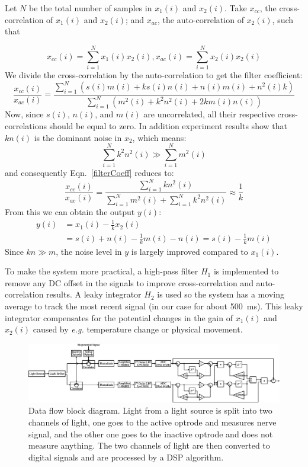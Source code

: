 Let $N$ be the total number of samples in $x_1(i)$ and $x_2(i)$.  Take $x_{cc}$, the cross-correlation of $x_1(i)$ and $x_2(i)$; and $x_{ac}$, the auto-correlation of $x_2(i)$, such that

$$x_{cc}(i)=\displaystyle\sum_{i=1}^{N} x_1(i)x_2(i), x_{ac}(i)=\displaystyle\sum_{i=1}^{N} x_2(i)x_2(i)$$
We divide the cross-correlation by the auto-correlation to get the filter coefficient:
\begin{equation}
\label{filterCoeff}
    \frac{x_{cc}(i)}{x_{ac}(i)} =\frac{\displaystyle\sum_{i=1}^{N} \left(s(i)m(i)+ks(i)n(i)+n(i)m(i)+n^2(i)k\right)}{\displaystyle\sum_{i=1}^{N} \left(m^2(i)+k^2n^2(i)+2km(i)n(i)\right)}
\end{equation}
Now, since $s(i)$, $n(i)$, and $m(i)$ are uncorrelated, all their respective cross-correlations should be equal to zero. In addition experiment results show that $kn(i)$ is the dominant noise in $x_2$, which means: 
$$
\sum_{i=1}^{N} k^2n^2(i) \gg \sum_{i=1}^{N} m^2(i)
$$
and consequently Eqn.~\ref{filterCoeff} reduces to:
$$
\frac{x_{cc}(i)}{x_{ac}(i)}=\frac{\displaystyle\sum_{i=1}^{N} kn^2(i)}{\displaystyle\sum_{i=1}^{N} m^2(i) + \displaystyle\sum_{i=1}^{N} k^2n^2(i)} \approx \frac{1}{k} 
$$
From this we can obtain the output $y(i)$:
\begin{align*}
    y(i)&=x_1(i)-\frac{1}{k}x_2(i) \\
    &=s(i)+n(i)-\frac{1}{k}m(i)-n(i)=s(i)-\frac{1}{k}m(i)
\end{align*}
Since $kn \gg m$, the noise level in $y$ is largely improved compared to $x_1(i)$.

To make the system more practical, a high-pass filter $H_1$ is implemented to remove any DC offset in the signals to improve cross-correlation and auto-correlation results.  A leaky integrator $H_2$ is used so the system has a moving average to track the most recent signal (in our case for about \qty{500}{ms}).  This leaky integrator compensates for the potential changes in the gain of $x_1(i)$ and $x_2(i)$ caused by {\em e.g.} temperature change or physical movement.

\begin{figure}[h]
\centerline{\includegraphics[width=1\linewidth]{4-ANC_Sys/DataFlow.pdf}}
\caption{Data flow block diagram.  Light from a light source is split into two channels of light, one goes to the active optrode and measures nerve signal, and the other one goes to the inactive optrode and does not measure anything.  The two channels of light are then converted to digital signals and are processed by a DSP algorithm.}
\label{fig_DataFlow}
\end{figure}

